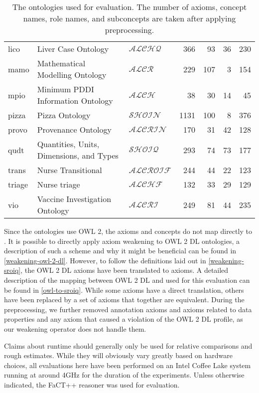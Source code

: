 \begin{table}[ht]
\begin{tabular}{|l|llrrrr|}
    lico & Liver Case Ontology & $\mathcal{ALCHQ}$ & 366 & 93 & 36 & 230 \\
    mamo & Mathematical Modelling Ontology & $\mathcal{ALCR}$ & 229 & 107 & 3 & 154 \\
    mpio & Minimum PDDI Information Ontology & $\mathcal{ALCH}$ & 38 & 30 & 14 & 45 \\
    pizza & Pizza Ontology & $\mathcal{SHOIN}$ & 1131 & 100 & 8 & 376 \\
    provo & Provenance Ontology & $\mathcal{ALCRIN}$ & 170 & 31 & 42 & 128 \\
    qudt & Quantities, Units, Dimensions, and Types & $\mathcal{SHOIQ}$ & 293 & 74 & 73 & 177 \\
    trans & Nurse Transitional & $\mathcal{ALCROIF}$ & 244 & 44 & 22 & 123 \\
    triage & Nurse triage & $\mathcal{ALCHF}$ & 132 & 33 & 29 & 129 \\
    vio & Vaccine Investigation Ontology & $\mathcal{ALCRI}$ & 249 & 81 & 44 & 235 \\
    \hline
  \end{tabular}
  \caption{The ontologies used for evaluation. The number of axioms, concept names, role names, and subconcepts are taken after applying preprocessing.}
  \label{table:ontologies}
\end{table}

Since the ontologies use OWL 2, the axioms and concepts do not map directly to \SROIQ. It is possible to directly apply axiom weakening to OWL 2 DL ontologies, a description of such a scheme and why it might be beneficial can be found in \cref{weakening-owl-2-dl}. However, to follow the definitions laid out in \cref{weakening-sroiq}, the OWL 2 DL axioms have been translated to \SROIQ axioms. A detailed description of the mapping between OWL 2 DL and \SROIQ used for this evaluation can be found in \cref{owl-to-sroiq}. While some axioms have a direct translation, others have been replaced by a set of axioms that together are equivalent. During the preprocessing, we further removed annotation axioms and axioms related to data properties and any axiom that caused a violation of the OWL 2 DL profile, as our weakening operator does not handle them.

Claims about runtime should generally only be used for relative comparisons and rough estimates. While they will obviously vary greatly based on hardware choices, all evaluations here have been performed on an Intel Coffee Lake system running at around 4GHz for the duration of the experiments. Unless otherwise indicated, the FaCT++ reasoner \cite{tsarkov2006fact++,factpp} was used for evaluation.

